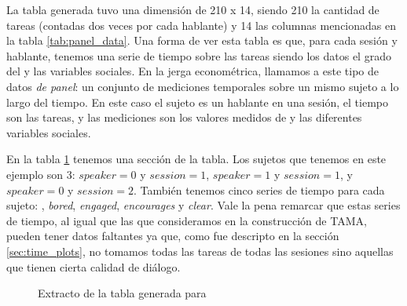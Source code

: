 La tabla generada tuvo una dimensión de 210 x 14, siendo 210 la cantidad de tareas (contadas dos veces por cada hablante) y 14 las columnas mencionadas en la tabla \ref{tab:panel_data}. Una forma de ver esta tabla es que, para cada sesión y hablante, tenemos una serie de tiempo sobre las tareas   siendo los datos el grado del \entrainment y las variables sociales. En la jerga econométrica, llamamos a este tipo de datos \emph{de panel}\cite{gujarati1999}: un conjunto de mediciones temporales sobre un mismo sujeto a lo largo del tiempo. En este caso el sujeto es un hablante en una sesión, el tiempo son las tareas, y las mediciones son los valores medidos de \entrainment y las diferentes variables sociales.

En la tabla \ref{tab:panel_data_example} tenemos una sección de la tabla. Los sujetos que tenemos en este ejemplo son 3: $speaker = 0$ y $session=1$, $speaker = 1$ y $session=1$, y $speaker = 0$ y $session=2$. También tenemos cinco series de tiempo para cada sujeto: \entrainment, \emph{bored}, \emph{engaged}, \emph{encourages} y \emph{clear}. Vale la pena remarcar que estas series de tiempo, al igual que las que consideramos en la construcción de TAMA, pueden tener datos faltantes ya que, como fue descripto en la sección \ref{sec:time_plots}, no tomamos todas las tareas de todas las sesiones sino aquellas que tienen cierta calidad de diálogo.


\begin{figure}
\centering

\caption{Extracto de la tabla generada para \FOMEAN}
\label{tab:panel_data_example}
\end{figure}
